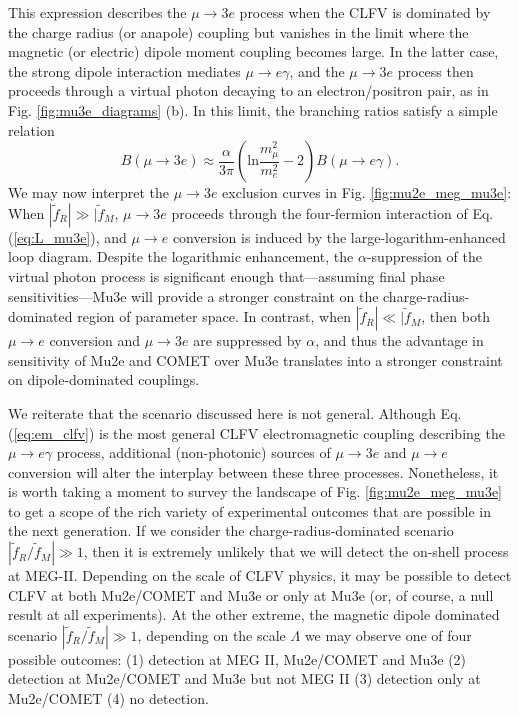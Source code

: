 \documentclass[12pt,letterpaper]{book}
\begin{document}
This expression describes the $\mu\rightarrow 3e$ process when the CLFV is dominated by the charge radius (or anapole) coupling but vanishes in the limit where the magnetic (or electric) dipole moment coupling becomes large. In the latter case, the strong dipole interaction mediates $\mu\rightarrow e\gamma$, and the $\mu\rightarrow 3e$ process then proceeds through a virtual photon decaying to an electron/positron pair, as in Fig. \ref{fig:mu3e_diagrams} (b). In this limit, the branching ratios satisfy a simple relation \cite{PhysRevD.53.2442}
\begin{equation}
B(\mu\rightarrow 3e)\approx \frac{\alpha}{3\pi}\left(\mathrm{ln}\frac{m_{\mu}^2}{m_e^2}-2\right)B(\mu\rightarrow e\gamma).
\end{equation}
We may now interpret the $\mu\rightarrow 3e$ exclusion curves in Fig. \ref{fig:mu2e_meg_mu3e}: When $|\tilde{f}_R|\gg |\tilde{f}_M$, $\mu\rightarrow 3e$ proceeds through the four-fermion interaction of Eq. (\ref{eq:L_mu3e}), and $\mu\rightarrow e$ conversion is induced by the large-logarithm-enhanced loop diagram. Despite the logarithmic enhancement, the $\alpha$-suppression of the virtual photon process is significant enough that---assuming final phase sensitivities---Mu3e will provide a stronger constraint on the charge-radius-dominated region of parameter space. In contrast, when $|\tilde{f}_R|\ll |\tilde{f}_M$, then both $\mu\rightarrow e$ conversion and $\mu\rightarrow 3e$ are suppressed by $\alpha$, and thus the advantage in sensitivity of Mu2e and COMET over Mu3e translates into a stronger constraint on dipole-dominated couplings. 

We reiterate that the scenario discussed here is not general. Although Eq. (\ref{eq:em_clfv}) is the most general CLFV electromagnetic coupling describing the $\mu\rightarrow e\gamma$ process, additional (non-photonic) sources of $\mu\rightarrow 3e$ and $\mu\rightarrow e$ conversion will alter the interplay between these three processes. Nonetheless, it is worth taking a moment to survey the landscape of Fig. \ref{fig:mu2e_meg_mu3e} to get a scope of the rich variety of experimental outcomes that are possible in the next generation. If we consider the charge-radius-dominated scenario $|\tilde{f}_R/\tilde{f}_M|\gg 1$, then it is extremely unlikely that we will detect the on-shell process at MEG-II. Depending on the scale of CLFV physics, it may be possible to detect CLFV at both Mu2e/COMET and Mu3e or only at Mu3e (or, of course, a null result at all experiments). At the other extreme, the magnetic dipole dominated scenario $|\tilde{f}_R/\tilde{f}_M|\gg 1$, depending on the scale $\Lambda$ we may observe one of four possible outcomes: (1) detection at MEG II, Mu2e/COMET and Mu3e (2) detection at Mu2e/COMET and Mu3e but not MEG II (3) detection only at Mu2e/COMET (4) no detection. 
\end{document}
